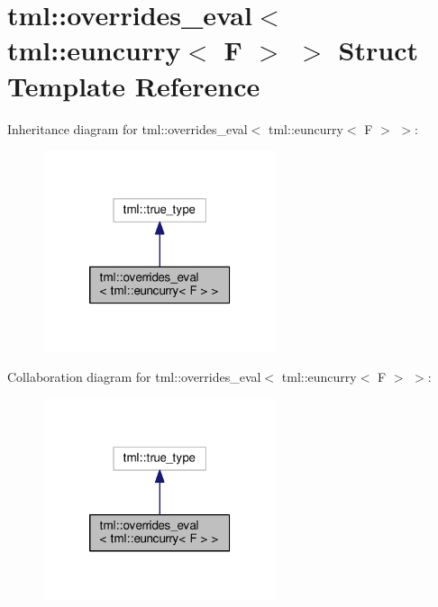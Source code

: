 \hypertarget{structtml_1_1overrides__eval_3_01tml_1_1euncurry_3_01_f_01_4_01_4}{\section{tml\+:\+:overrides\+\_\+eval$<$ tml\+:\+:euncurry$<$ F $>$ $>$ Struct Template Reference}
\label{structtml_1_1overrides__eval_3_01tml_1_1euncurry_3_01_f_01_4_01_4}
}


Inheritance diagram for tml\+:\+:overrides\+\_\+eval$<$ tml\+:\+:euncurry$<$ F $>$ $>$\+:
\nopagebreak
\begin{figure}[H]
\begin{center}
\leavevmode
\includegraphics[width=194pt]{structtml_1_1overrides__eval_3_01tml_1_1euncurry_3_01_f_01_4_01_4__inherit__graph}
\end{center}
\end{figure}


Collaboration diagram for tml\+:\+:overrides\+\_\+eval$<$ tml\+:\+:euncurry$<$ F $>$ $>$\+:
\nopagebreak
\begin{figure}[H]
\begin{center}
\leavevmode
\includegraphics[width=194pt]{structtml_1_1overrides__eval_3_01tml_1_1euncurry_3_01_f_01_4_01_4__coll__graph}
\end{center}
\end{figure}


